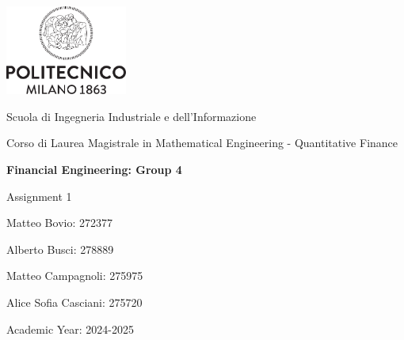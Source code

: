 \documentclass[12pt]{article}
\newcommand{\titlepagecontent}{
    \centering
    \includegraphics[width=0.3\textwidth]{imgs/logo.pdf}\\
    \vspace{0.5cm}
    {\large Scuola di Ingegneria Industriale e dell'Informazione\par}
    {\large Corso di Laurea Magistrale in Mathematical Engineering - Quantitative Finance\par}
    \vspace{3cm}
    {\LARGE\bfseries Financial Engineering: Group 4\par Assignment 1\par}
    \vfill
    {\large Matteo Bovio: 272377\par}
    {\large Alberto Busci: 278889\par}
    {\large Matteo Campagnoli: 275975\par}
    {\large Alice Sofia Casciani: 275720\par}
    \vspace{1cm}
    \centering
    \vfill
    {\large Academic Year: 2024-2025\par}
}
\begin{document}
{\large}
\begin{titlingpage}
    \titlepagecontent
\end{titlingpage}

\clearpage

\tableofcontents
\clearpage

\end{document}
